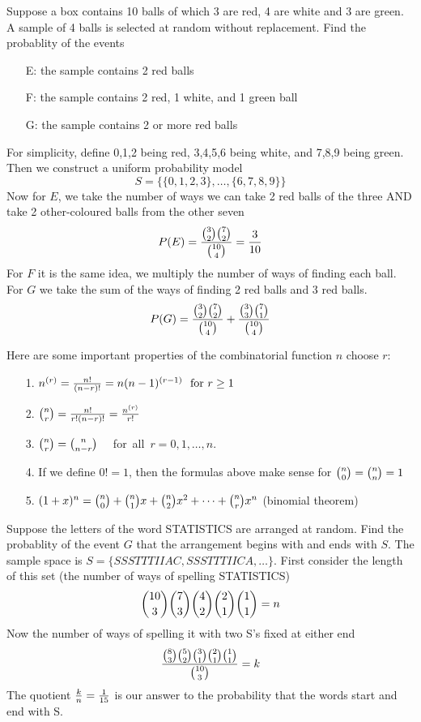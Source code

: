 \documentclass[english, 11pt]{article}
\begin{document}
  \begin{exmp}
  Suppose a box contains 10 balls of which 3 are red, 4 are white and 3 are green. A sample of 4 balls is selected at random without replacement. Find the probablity of the events
  \begin{itemize}
    \item[E:] the sample contains 2 red balls
    \item[F:] the sample contains 2 red, 1 white, and 1 green ball
    \item[G:] the sample contains 2 or more red balls
  \end{itemize}
  For simplicity, define 0,1,2 being red, 3,4,5,6 being white, and 7,8,9 being green. Then we construct a uniform probability model
  \[ S = \{ \{0,1,2,3\}, \ldots, \{ 6,7,8,9 \} \} \]
  Now for $E$, we take the number of ways we can take 2 red balls of the three AND take 2 other-coloured balls from the other seven
  \[ P(E) = \frac{{3 \choose 2}{7 \choose 2}}{{10 \choose 4}} = \frac{3}{10} \]
  For $F$ it is the same idea, we multiply the number of ways of finding each ball. For $G$ we take the sum of the ways of finding 2 red balls and 3 red balls.
  \[ P(G) = \frac{{3 \choose 2}{7 \choose 2}}{{10 \choose 4}} + \frac{{3 \choose 3}{7 \choose 1}}{{10 \choose 4}} \]
  \end{exmp}

  Here are some important properties of the combinatorial function $n$ choose $r$:
  \begin{itemize}
    \item[1.] $n^{(r)} = \f{n!}{(n-r)!} = n(n-1)^{(r-1)} \mbox{ \ for $r \geq 1$ }$
    \item[2.] ${n \choose r} = \frac{n!}{r!(n-r)!} = \frac{n^{(r)}}{r!}$
    \item[3.] ${n \choose r} = {n \choose n-r}$ \mbox{ \ for all $r = 0,1,\ldots,n$}.
    \item[4.] If we define $0! = 1$, then the formulas above make sense for ${n \choose 0} = {n \choose n} = 1$
    \item[5.] $(1+x)^n = {n \choose 0} + {n \choose 1}x + {n \choose 2}x^2 + \cdots + {n \choose r}x^n$ (binomial theorem)
  \end{itemize}

  \begin{exmp}
    Suppose the letters of the word STATISTICS are arranged at random. Find the probablity of the event $G$ that the arrangement begins with and ends with $S$. The sample space is $S = \{ SSSTTTIIAC, SSSTTTIICA, \ldots \}$. First consider the length of this set (the number of ways of spelling STATISTICS)
    \[ {10 \choose 3}{7 \choose 3}{4 \choose 2}{2 \choose 1}{1 \choose 1} = n \]
    Now the number of ways of spelling it with two S's fixed at either end
    \[ \frac{{8 \choose 3}{5 \choose 2}{3 \choose 1}{2 \choose 1}{1 \choose 1}}{{10 \choose 3}} = k\]
    The quotient $\frac{k}{n} = \frac{1}{15}$ is our answer to the probability that the words start and end with S.
  \end{exmp}
\end{document}
